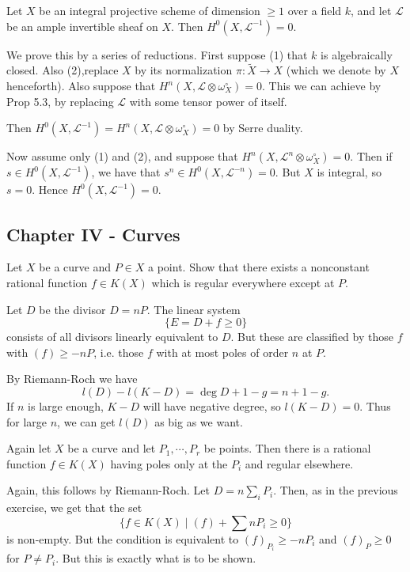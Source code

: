 \documentclass[11pt, english]{article}
\begin{document}
\begin{exc}[Exc 7.1]
Let $X$ be an integral projective scheme of dimension $\ge 1$ over a field $k$, and let $\mathscr L$ be an ample invertible sheaf on $X$. Then $H^0(X, \mathscr L^{-1})=0$.
\end{exc}
\begin{sol}
We prove this by a series of reductions. First suppose (1) that $k$ is algebraically closed. Also (2),replace $X$ by its normalization $\pi: \widetilde X \to X$ (which we denote by $X$ henceforth). Also suppose that $H^n(X, \mathscr L \otimes \omega_X^\circ)=0$. This we can achieve by Prop 5.3, by replacing $\mathscr L$ with some tensor power of itself.

Then $H^0(X,\mathscr L^{-1})=H^n(X, \mathscr L \otimes \omega_X^\circ)=0$ by Serre duality.

Now assume only (1) and (2), and suppose that $H^n(X,\mathscr L^n \otimes \omega_X^\circ)=0$. Then if $s \in H^0(X, \mathscr L^{-1})$, we have that $s^n \in H^0(X, \mathscr L^{-n})=0$. But $X$ is integral, so $s=0$. Hence $H^0(X, \mathscr L^{-1})=0$.


\end{sol}

\subsection{Chapter IV - Curves}

\begin{exc}[Exercise 1.1]
Let $X$ be a curve and $P \in X$ a point. Show that there exists a nonconstant rational function $f \in K(X)$ which is regular everywhere except at $P$.
\end{exc}
\begin{sol}
Let $D$ be the divisor $D=nP$. The linear system 
$$
\{ E = D + f \geq 0 \}
$$
consists of all divisors linearly equivalent to $D$. But these are classified by those $f$ with $(f) \geq -nP$, i.e. those $f$ with at most poles of order $n$ at $P$.

By Riemann-Roch we have
$$
l(D)-l(K-D) = \deg D +1 -g = n+1-g.
$$
If $n$ is large enough, $K-D$ will have negative degree, so $l(K-D)=0$. Thus for large $n$, we can get $l(D)$ as big as we want.
\end{sol}

\begin{exc}[Exercise 1.2]
Again let $X$ be a curve and let $P_1,\cdots,P_r$ be points. Then there is a rational function $f \in K(X)$ having poles only at the $P_i$ and regular elsewhere.
\end{exc}
\begin{exc}
Again, this follows by Riemann-Roch. Let $D=n\sum_i P_i$. Then, as in the previous exercise, we get that the set
$$
\{ f \in K(X) \mid (f) + \sum nP_i \geq 0 \}
$$
is non-empty. But the condition is equivalent to $(f)_{P_i} \geq -nP_i$ and $(f)_P \geq 0$ for $P \neq P_i$. But this is exactly what is to be shown.
\end{exc}
\end{document}
